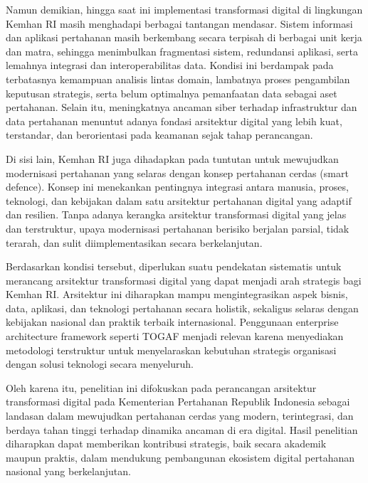 Namun demikian, hingga saat ini implementasi transformasi digital di lingkungan Kemhan RI masih menghadapi berbagai tantangan mendasar.
Sistem informasi dan aplikasi pertahanan masih berkembang secara terpisah di berbagai unit kerja dan matra, sehingga menimbulkan fragmentasi sistem, redundansi aplikasi, serta lemahnya integrasi dan interoperabilitas data.
Kondisi ini berdampak pada terbatasnya kemampuan analisis lintas domain, lambatnya proses pengambilan keputusan strategis, serta belum optimalnya pemanfaatan data sebagai aset pertahanan.
Selain itu, meningkatnya ancaman siber terhadap infrastruktur dan data pertahanan menuntut adanya fondasi arsitektur digital yang lebih kuat, terstandar, dan berorientasi pada keamanan sejak tahap perancangan.

Di sisi lain, Kemhan RI juga dihadapkan pada tuntutan untuk mewujudkan modernisasi pertahanan yang selaras dengan konsep pertahanan cerdas (smart defence).
Konsep ini menekankan pentingnya integrasi antara manusia, proses, teknologi, dan kebijakan dalam satu arsitektur pertahanan digital yang adaptif dan resilien.
Tanpa adanya kerangka arsitektur transformasi digital yang jelas dan terstruktur, upaya modernisasi pertahanan berisiko berjalan parsial, tidak terarah, dan sulit diimplementasikan secara berkelanjutan.

Berdasarkan kondisi tersebut, diperlukan suatu pendekatan sistematis untuk merancang arsitektur transformasi digital yang dapat menjadi arah strategis bagi Kemhan RI.
Arsitektur ini diharapkan mampu mengintegrasikan aspek bisnis, data, aplikasi, dan teknologi pertahanan secara holistik, sekaligus selaras dengan kebijakan nasional dan praktik terbaik internasional.
Penggunaan enterprise architecture framework seperti TOGAF menjadi relevan karena menyediakan metodologi terstruktur untuk menyelaraskan kebutuhan strategis organisasi dengan solusi teknologi secara menyeluruh.

Oleh karena itu, penelitian ini difokuskan pada perancangan arsitektur transformasi digital pada Kementerian Pertahanan Republik Indonesia sebagai landasan dalam mewujudkan pertahanan cerdas yang modern, terintegrasi, dan berdaya tahan tinggi terhadap dinamika ancaman di era digital.
Hasil penelitian diharapkan dapat memberikan kontribusi strategis, baik secara akademik maupun praktis, dalam mendukung pembangunan ekosistem digital pertahanan nasional yang berkelanjutan.

